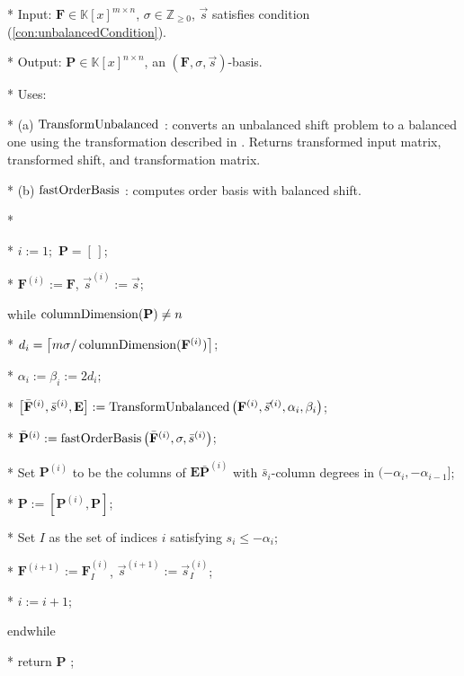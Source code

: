\begin{algorithm}
\caption{$\umab\left(\mathbf{F},\sigma,\vec{s}\right)$ }


\label{alg:umab} 
\begin{algor}
\item [{{{*}}}] Input: $\mathbf{F}\in\mathbb{K}\left[x\right]^{m\times n}$,
$\sigma\in\mathbb{Z}_{\ge0}$, $\vec{s}$ satisfies condition (\ref{con:unbalancedCondition}).
\item [{{{*}}}] Output: $\mathbf{P}\in\mathbb{K}\left[x\right]^{n\times n}$,
an $\left(\mathbf{F},\sigma,\vec{s}\right)$-basis.
\item [{{{*}}}] Uses:
\item [{{*}}] (a) $\TransformUnbalanced$ : converts an unbalanced shift
problem to a balanced one using the transformation described in .
Returns transformed input matrix, transformed shift, and transformation
matrix.
\item [{{*}}] (b) %
$\mmab$ : computes order basis with balanced shift. 
\item [{{*}}]~\end{algor}
\begin{algor}[1]
\item [{{{*}}}]  $i:=1;$ $\mathbf{P}=[\,]$;
\item [{{{*}}}] $\mathbf{F}^{\left(i\right)}:=\mathbf{F}$, $\vec{s}^{\left(i\right)}:=\vec{s}$;
\item [{{while}}] $\columnDimension(\mathbf{P})\ne n$
\item [{{{*}}}] $d_{i}=\left\lceil m\sigma/\columnDimension(\mathbf{F}^{\left(i\right)})\right\rceil $;
\item [{{{*}}}] $\alpha_{i}:=\beta_{i}:=2d_{i};$
\item [{{{*}}}] $\left[\bar{\mathbf{F}}^{\left(i\right)},\bar{s}^{\left(i\right)},\mathbf{E}\right]:=\TransformUnbalanced\left(\mathbf{F}^{\left(i\right)},\vec{s}^{\left(i\right)},\alpha_{i},\beta_{i}\right)$;
\item [{{{*}}}] $\bar{\mathbf{P}}^{\left(i\right)}:=\mmab\left(\bar{\mathbf{F}}^{\left(i\right)},\sigma,\bar{s}^{\left(i\right)}\right)$;
\item [{{{*}}}] Set $\mathbf{P}^{\left(i\right)}$ to be the columns
of $\mathbf{E}\bar{\mathbf{P}}^{\left(i\right)}$ with $\bar{s}_{i}$-column
degrees in $(-\alpha_{i},-\alpha_{i-1}]$;
\item [{{{*}}}] $\mathbf{P}:=\left[\mathbf{P}^{\left(i\right)},\mathbf{P}\right]$;
\item [{{{*}}}] Set $I$ as the set of indices $i$ satisfying $s_{i}\le-\alpha_{i}$;
\item [{{{*}}}] $\mathbf{F}^{\left(i+1\right)}:=\mathbf{F}_{I}^{\left(i\right)}$,
$\vec{s}^{\left(i+1\right)}:=\vec{s}_{I}^{\left(i\right)}$;
\item [{{{*}}}] $i:=i+1$;
\item [{{endwhile}}] ~
\item [{{{*}}}] return $\mathbf{P}$ ; \end{algor}
\end{algorithm}

